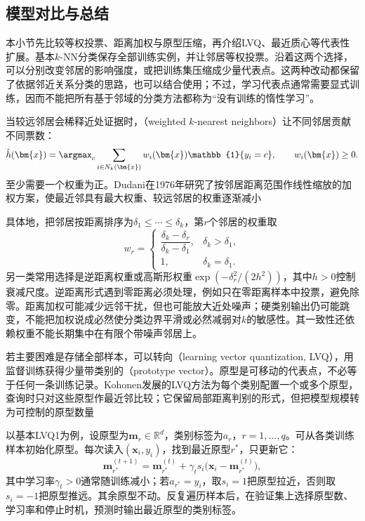 \subsection{模型对比与总结}
\label{sec:classification-instances-comparison}

本小节先比较等权投票、距离加权与原型压缩，再介绍LVQ、最近质心等代表性扩展。基本$k$-NN分类保存全部训练实例，并让邻居等权投票。沿着这两个选择，可以分别改变邻居的影响强度，或把训练集压缩成少量代表点。这两种改动都保留了依据邻近关系分类的思路，也可以结合使用；不过，学习代表点通常需要显式训练，因而不能把所有基于邻域的分类方法都称为“没有训练的惰性学习”。

当较远邻居会稀释近处证据时，（weighted $k$-nearest neighbors）让不同邻居贡献不同票数：
\begin{equation}
  \hat h(\bm{x})=\argmax_c
  \sum_{i\in N_k(\bm{x})}
  w_i(\bm{x})\mathbb{1}\{y_i=c\},
  \qquad w_i(\bm{x})\geq0.
  \label{eq:classification-weighted-knn}
\end{equation}
至少需要一个权重为正。Dudani在1976年研究了按邻居距离范围作线性缩放的加权方案，使最近邻具有最大权重、较远邻居的权重逐渐减小

具体地，把邻居按距离排序为$\delta_1\leq\cdots\leq\delta_k$，第$r$个邻居的权重取
\begin{equation}
  w_r=
  \begin{cases}
    \dfrac{\delta_k-\delta_r}{\delta_k-\delta_1},
      & \delta_k>\delta_1,\\[4pt]
    1, & \delta_k=\delta_1.
  \end{cases}
  \label{eq:classification-dudani-weights}
\end{equation}
另一类常用选择是逆距离权重或高斯形权重$\exp(-\delta_r^2/(2h^2))$，其中$h>0$控制衰减尺度。逆距离形式遇到零距离必须处理，例如只在零距离样本中投票，避免除零。距离加权可能减少远邻干扰，但也可能放大近处噪声；硬类别输出仍可能跳变，不能把加权说成必然使分类边界平滑或必然减弱对$k$的敏感性。其一致性还依赖权重不能长期集中在有限个带噪声邻居上。

若主要困难是存储全部样本，可以转向（learning vector quantization, LVQ），用监督训练获得少量带类别的（prototype vector）。原型是可移动的代表点，不必等于任何一条训练记录。Kohonen发展的LVQ方法为每个类别配置一个或多个原型，查询时只对这些原型作最近邻比较；它保留局部距离判别的形式，但把模型规模转为可控制的原型数量

以基本LVQ1为例，设原型为$\bm{m}_r\in\mathbb{R}^d$，类别标签为$a_r$，$r=1,\ldots,q$。可从各类训练样本初始化原型。每次读入$(\bm{x}_i,y_i)$，找到最近原型$r^\ast$，只更新它：
\begin{equation}
  \bm{m}_{r^\ast}^{(t+1)}
  =\bm{m}_{r^\ast}^{(t)}
   +\gamma_t s_i
    \bigl(\bm{x}_i-\bm{m}_{r^\ast}^{(t)}\bigr),
  \label{eq:classification-lvq-update}
\end{equation}
其中学习率$\gamma_t>0$通常随训练减小；若$a_{r^\ast}=y_i$，取$s_i=1$把原型拉近，否则取$s_i=-1$把原型推远。其余原型不动。反复遍历样本后，在验证集上选择原型数、学习率和停止时机，预测时输出最近原型的类别标签。

